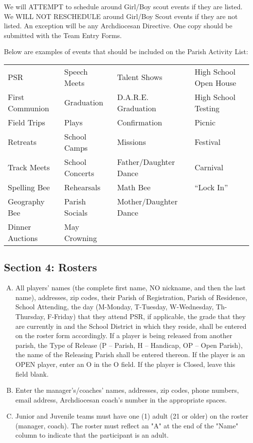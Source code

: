 \documentclass[draft]{memoir}
\begin{document}
We will ATTEMPT to schedule around Girl/Boy scout events if they are listed.  We WILL NOT RESCHEDULE around Girl/Boy Scout events if they are not listed.  An exception will be any Archdiocesan Directive. 
One copy should be submitted with the Team Entry Forms.

Below are examples of events that should be included on the Parish Activity List:

\begin{center}
    \begin{tabular}{>{\small}l >{\small}l >{\small}l >{\small}l}
        PSR & Speech Meets & Talent Shows & High School Open House \\
        First Communion & Graduation & D.A.R.E. Graduation & High School Testing \\
        Field Trips	& Plays & Confirmation & Picnic \\
        Retreats & School Camps & Missions & Festival \\
        Track Meets	& School Concerts & Father/Daughter Dance & Carnival \\
        Spelling Bee & Rehearsals & Math Bee & “Lock In” \\
        Geography Bee & Parish Socials & Mother/Daughter Dance	\\
        Dinner	Auctions & May Crowning & & \\
    \end{tabular}
\end{center}

\subsection{Section 4: Rosters}
\begin{enumerate}[A.]
    \item All players’ names (the complete first name, NO nickname, and then the last name), addresses, zip codes, their Parish of Registration, Parish of Residence, School Attending, the day (M-Monday, T-Tuesday, W-Wednesday, Th-Thursday, F-Friday) that they attend PSR, if applicable, the grade that they are currently in and the School District in which they reside, shall be entered on the roster form accordingly.  If a player is being released from another parish, the Type of Release (P – Parish, H – Handicap, OP – Open Parish), the name of the Releasing Parish shall be entered thereon.  If the player is an OPEN player, enter an O in the O field.  If the player is Closed, leave this field blank.
    \item Enter the manager’s/coaches’ names, addresses, zip codes, phone numbers, email address, Archdiocesan coach’s number in the appropriate spaces.
    \item Junior and Juvenile teams must have one (1) adult (21 or older) on the roster (manager, coach).  The roster must reflect an "A" at the end of the "Name" column to indicate that the participant is an adult.
\end{enumerate}
\end{document}
